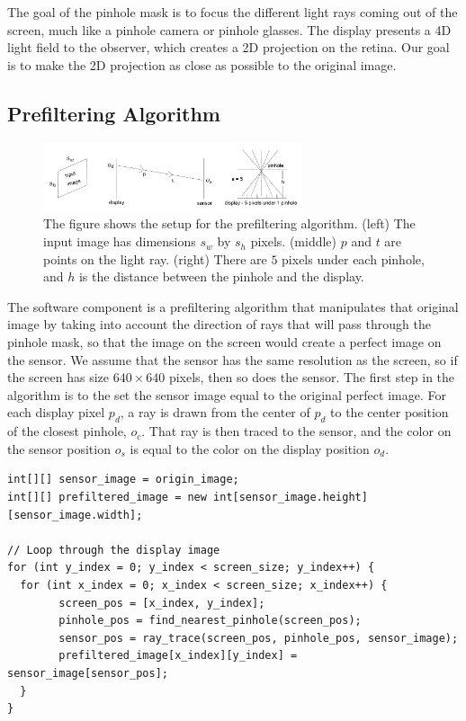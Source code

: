 \documentclass{acmsiggraph}
\begin{document}
The goal of the pinhole mask is to focus the different light rays coming out of the screen, much like a pinhole camera or pinhole glasses. The display presents a 4D light field to the observer, which creates a 2D projection on the retina. Our goal is to make the 2D projection as close as possible to the original image. 

\subsection{Prefiltering Algorithm}

\begin{figure}[ht]
  \centering
  \includegraphics[width=3.0in]{Prefilter.png}
  \caption{The figure shows the setup for the prefiltering algorithm. (left) The input image has dimensions $s_w$ by $s_h$ pixels. (middle) $p$ and $t$ are points on the light ray. (right) There are $5$ pixels under each pinhole, and $h$ is the distance between the pinhole and the display.}
  \label{fig:fr}
\end{figure}

The software component is a prefiltering algorithm that manipulates that original image by taking into account the direction of rays that will pass through the pinhole mask, so that the image on the screen would create a perfect image on the sensor. We assume that the sensor has the same resolution as the screen, so if the screen has size $640 \times 640$ pixels, then so does the sensor. The first step in the algorithm is to the set the sensor image equal to the original perfect image. For each display pixel $p_d$, a ray is drawn from the center of $p_d$ to the center position of the closest pinhole, $o_c$. That ray is then traced to the sensor, and the color on the sensor position $o_s$ is equal to the color on the display position $o_d$. 

\begin{lstlisting}[frame=single, caption=Pseudocode For Prefiltering Algorithm]
int[][] sensor_image = origin_image;
int[][] prefiltered_image = new int[sensor_image.height][sensor_image.width];

// Loop through the display image
for (int y_index = 0; y_index < screen_size; y_index++) {
  for (int x_index = 0; x_index < screen_size; x_index++) {
        screen_pos = [x_index, y_index];
        pinhole_pos = find_nearest_pinhole(screen_pos);
        sensor_pos = ray_trace(screen_pos, pinhole_pos, sensor_image);
        prefiltered_image[x_index][y_index] = sensor_image[sensor_pos];
  }
}
\end{lstlisting}
\end{document}
